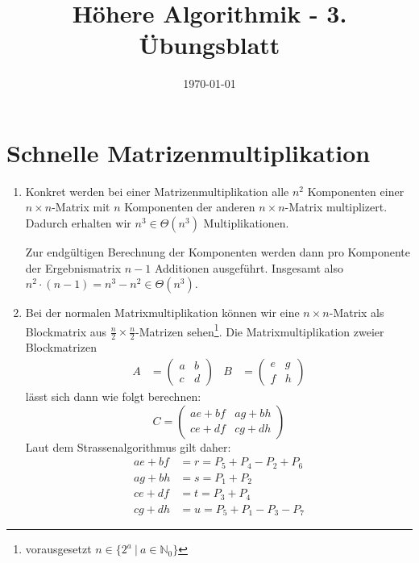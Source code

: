 \documentclass[a4paper,10pt]{scrartcl}
\title{H\"ohere Algorithmik - 3. \"Ubungsblatt}
\author{\Authors}
\date{\today}
\begin{document}
\maketitle

\section{Schnelle Matrizenmultiplikation}
\begin{enumerate}
\item   Konkret werden bei einer Matrizenmultiplikation alle $n^2$ Komponenten einer $n \times n$-Matrix mit $n$ Komponenten
        der anderen $n \times n$-Matrix multiplizert. Dadurch erhalten wir $n^3 \in \Theta(n^3)$ Multiplikationen.

        Zur endgültigen Berechnung der Komponenten werden dann pro Komponente der Ergebnismatrix $n-1$ Additionen ausgeführt.
        Insgesamt also $n^2 \cdot (n-1) = n^3 - n^2 \in \Theta(n^3)$.
        \item   Bei der normalen Matrixmultiplikation können wir eine $n \times n$-Matrix als Blockmatrix aus $\frac{n}{2}\times\frac{n}{2}$-Matrizen sehen\footnote{vorausgesetzt $n \in \{2^a\ |\ a \in \mathbb{N}_0\}$}. Die Matrixmultiplikation zweier Blockmatrizen
        \begin{align*}
         A &= \begin{pmatrix}
              a & b \\
              c & d
             \end{pmatrix} & 
         B &= \begin{pmatrix}
              e & g \\
              f & h
              \end{pmatrix}
        \end{align*}
        lässt sich dann wie folgt berechnen:
        \[
         C = \begin{pmatrix}
           ae + bf & ag + bh \\
           ce + df & cg + dh 
         \end{pmatrix}
        \]
        Laut dem Strassenalgorithmus gilt daher:
        \begin{align}
         ae + bf &= r = P_5 + P_4 - P_2 + P_6  \label{matrix_r} \\
         ag + bh &= s = P_1 + P_2 \label{matrix_s}\\
         ce + df &= t = P_3 + P_4 \label{matrix_t}\\
         cg + dh &= u = P_5 + P_1 - P_3 - P_7 \label{matrix_u}

\end{align}
\end{enumerate}
\end{document}
